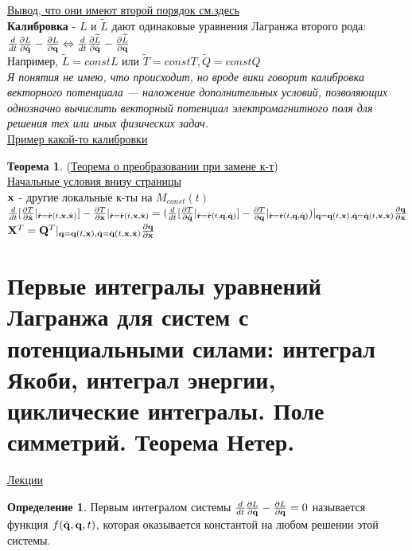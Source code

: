 \documentclass[specialist, subf, href, colorlinks=true, 12pt, times, mtpro, final]{disser}
\theoremstyle{definition}
\newtheorem{defn}{Определение}[section]
\newtheorem{theorem}{Теорема}[section]
\def\note{\textcolor{faded}}
\begin{document}
	\noindent\hyperlink {first_lects.29}{Вывод, что они имеют второй порядок см.здесь} \\
	
	\textbf{Калибровка} - $L$ и $\widetilde{L}$ дают одинаковые уравнения Лагранжа второго рода:\\
	$\frac{d}{dt}\frac{\partial L}{\partial \dot{\mathbf{q}}} - \frac{\partial L}{\partial \mathbf{q}} \Leftrightarrow \frac{d}{dt}\frac{\partial \widetilde{L}}{\partial \dot{\mathbf{q}}} - \frac{\partial \widetilde{L}}{\partial \mathbf{q}}$\\
	Например, $\widetilde{L} = const L$ или $\widetilde{T} = const  T, \widetilde{Q} = const Q$\\
	\note{\it Я понятия не имею, что происходит, но вроде вики говорит калибровка векторного потенциала — наложение дополнительных условий, позволяющих однозначно вычислить векторный потенциал электромагнитного поля для решения тех или иных физических задач.}\\
	
	\noindent\hyperlink {first_lects.30}{Пример какой-то калибровки} \\
	
	\begin{theorem}(\hyperlink {first_lects.31}{Теорема о преобразовании при замене к-т})\\
	
	\noindent\hyperlink {first_lects.31}{Начальные условия внизу страницы}\\
	
	$\mathbf{x}$ - другие локальные к-ты на $M_{const} (t)$\\
	$\frac{d}{dt}[\frac{\partial T}{\partial \dot{\mathbf{x}}}|_{\dot{\mathbf{r}} = \dot{\mathbf{r}}(t, \mathbf{x}, \dot{\mathbf{x}})}]  -  \frac{\partial T}{\partial \mathbf{x}}|_{\dot{\mathbf{r}} = \dot{\mathbf{r}}(t, \mathbf{x}, \dot{\mathbf{x}})} = 
	(\frac{d}{dt}[\frac{\partial T}{\partial \dot{\mathbf{q}}}|_{\dot{\mathbf{r}} = \dot{\mathbf{r}}(t, \mathbf{q}, \dot{\mathbf{q}})}]  -  \frac{\partial T}{\partial \mathbf{q}}|_{\dot{\mathbf{r}} = \dot{\mathbf{r}}(t, \mathbf{q}, \dot{\mathbf{q}})})|_{\mathbf{q} = \mathbf{q}(t, \mathbf{x}), \dot{\mathbf{q}} = \dot{\mathbf{q}} (t, \mathbf{x}, \dot{\mathbf{x}})} \frac{\partial \mathbf{q}}{\partial \mathbf{x}}$\\
	$\mathbf{X}^T =  \mathbf{Q}^T |_{\mathbf{q} = \mathbf{q}(t, \mathbf{x}), \dot{\mathbf{q}} = \dot{\mathbf{q}} (t, \mathbf{x}, \dot{\mathbf{x}})} \frac{\partial \mathbf{q}}{\partial \mathbf{x}}$ 
	\end{theorem}
	
	
     
    
    \section{Первые интегралы уравнений Лагранжа для систем с потенциальными силами:    интеграл Якоби, интеграл энергии, циклические интегралы. Поле симметрий. Теорема Нетер.}
     \label{8}
    \hyperlink {lects.1}{Лекции} \\
    \begin{defn}
	Первым интегралом системы $\frac{d}{dt}\frac{\partial L}{\partial \dot{\mathbf{q}}} - \frac{\partial L}{\partial \mathbf{q}} = 0$ называется функция $f(\dot{\mathbf{q}}, \mathbf{q}, t)$, которая оказывается константой на любом решении этой системы.   
    \end{defn}
    
\end{document}

